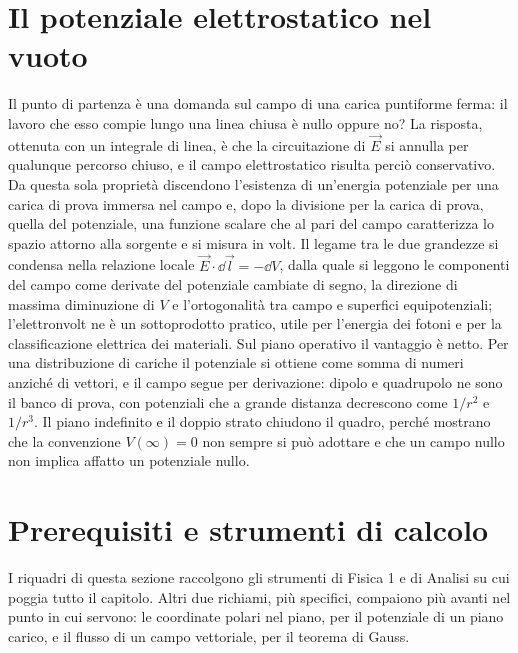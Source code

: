 \documentclass[main.tex]{subfiles}
\begin{document}
\renewcommand{\richiamoprefix}{}

	
	\section*{Il potenziale elettrostatico nel vuoto}
	
	Il punto di partenza è una domanda sul campo di una carica puntiforme ferma: il lavoro che esso compie lungo una linea chiusa è nullo oppure no? La risposta, ottenuta con un integrale di linea, è che la circuitazione di $\vec E$ si annulla per qualunque percorso chiuso, e il campo elettrostatico risulta perciò conservativo. Da questa sola proprietà discendono l'esistenza di un'energia potenziale per una carica di prova immersa nel campo e, dopo la divisione per la carica di prova, quella del potenziale, una funzione scalare che al pari del campo caratterizza lo spazio attorno alla sorgente e si misura in volt. Il legame tra le due grandezze si condensa nella relazione locale $\vec E\cdot\dd\vec l=-\dd V$, dalla quale si leggono le componenti del campo come derivate del potenziale cambiate di segno, la direzione di massima diminuzione di $V$ e l'ortogonalità tra campo e superfici equipotenziali; l'elettronvolt ne è un sottoprodotto pratico, utile per l'energia dei fotoni e per la classificazione elettrica dei materiali. Sul piano operativo il vantaggio è netto. Per una distribuzione di cariche il potenziale si ottiene come somma di numeri anziché di vettori, e il campo segue per derivazione: dipolo e quadrupolo ne sono il banco di prova, con potenziali che a grande distanza decrescono come $1/r^2$ e $1/r^3$. Il piano indefinito e il doppio strato chiudono il quadro, perché mostrano che la convenzione $V(\infty)=0$ non sempre si può adottare e che un campo nullo non implica affatto un potenziale nullo.
	
	\section*{Prerequisiti e strumenti di calcolo}
	
	I riquadri di questa sezione raccolgono gli strumenti di Fisica 1 e di Analisi su cui poggia tutto il capitolo. Altri due richiami, più specifici, compaiono più avanti nel punto in cui servono: le coordinate polari nel piano, per il potenziale di un piano carico, e il flusso di un campo vettoriale, per il teorema di Gauss.
	
\end{document}
